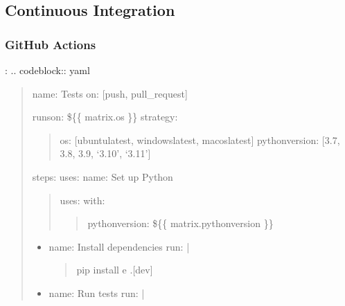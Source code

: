 \documentclass[a4paper,10pt,english,openany,oneside]{sphinxmanual}
\begin{document}
\subsection{Continuous Integration}
\label{\detokenize{testing:continuous-integration}}

\subsubsection{GitHub Actions}
\label{\detokenize{testing:github-actions}}
\sphinxAtStartPar
{}:
.. code\sphinxhyphen{}block:: yaml
\begin{quote}

\sphinxAtStartPar
name: Tests
on: {[}push, pull\_request{]}
\begin{description}
\begin{description}
\sphinxAtStartPar
runs\sphinxhyphen{}on: \$\{\{ matrix.os \}\}
strategy:
\begin{quote}
\begin{description}
\sphinxAtStartPar
os: {[}ubuntu\sphinxhyphen{}latest, windows\sphinxhyphen{}latest, macos\sphinxhyphen{}latest{]}
python\sphinxhyphen{}version: {[}3.7, 3.8, 3.9, ‘3.10’, ‘3.11’{]}

\end{description}
\end{quote}

\sphinxAtStartPar
steps:
\sphinxhyphen{} uses: 
\sphinxhyphen{} name: Set up Python
\begin{quote}

\sphinxAtStartPar
uses: 
with:
\begin{quote}

\sphinxAtStartPar
python\sphinxhyphen{}version: \$\{\{ matrix.python\sphinxhyphen{}version \}\}
\end{quote}
\end{quote}
\begin{itemize}
\item {} 
\sphinxAtStartPar
name: Install dependencies
run: |
\begin{quote}

\sphinxAtStartPar
pip install \sphinxhyphen{}e .{[}dev{]}
\end{quote}

\item {} 
\sphinxAtStartPar
name: Run tests
run: |
\begin{quote}


\end{quote}
\end{itemize}
\end{description}
\end{description}
\end{quote}
\end{document}
